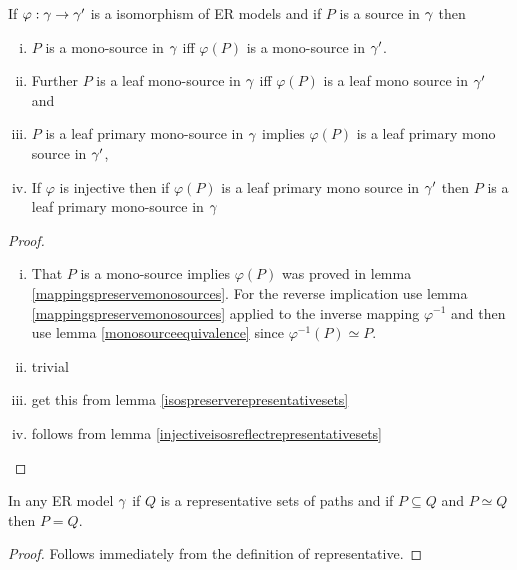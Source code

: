 \begin{lemma}
If $\varphi: \gamma \rightarrow \gamma'$ is a isomorphism of ER models and
if $P$ is a source in $\gamma$ then 
\begin{enumerate}[(i)]
\item
$P$ is a mono-source in $\gamma$ iff  $\varphi(P)$ is a mono-source in $\gamma'$. 
\item
Further  $P$ is a leaf mono-source in $\gamma$ iff $\varphi(P)$ is a leaf mono source in $\gamma'$ and 
\item
$P$ is a leaf primary mono-source in $\gamma$ implies  $\varphi(P)$ is a leaf primary mono source in $\gamma'$,
\item
If $\varphi$ is injective then
if $\varphi(P)$ is a leaf primary mono source in $\gamma'$ then $P$ is a leaf primary mono-source in $\gamma$
\end{enumerate}
\end{lemma}
\begin{proof}

\begin{enumerate} [(i)]
\item
That $P$ is a mono-source implies $\varphi(P)$ was proved
in lemma \ref{mappingspreservemonosources}. For the reverse implication use 
lemma \ref{mappingspreservemonosources} applied to the inverse mapping $\varphi^{-1}$
and then use lemma \ref{monosourceequivalence} since $\varphi^{-1}(P) \simeq P$.
\item
trivial
\item
get this from lemma \ref{isospreserverepresentativesets} 
\item
follows from lemma \ref{injectiveisosreflectrepresentativesets}
\end{enumerate}

\end{proof}

\begin{lemma}
In any ER model $\gamma$ if $Q$ is a representative sets of paths and if $P \subseteq Q$ and $P \simeq Q$ then $P=Q$.
\end{lemma}
\begin{proof}
Follows immediately from the definition of representative.
\end{proof}



